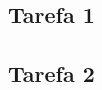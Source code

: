 \documentclass[9pt,conference]{IEEEtran}
\begin{document}

\subsection{Tarefa 1}

%

\subsection{Tarefa 2}
\end{document}
